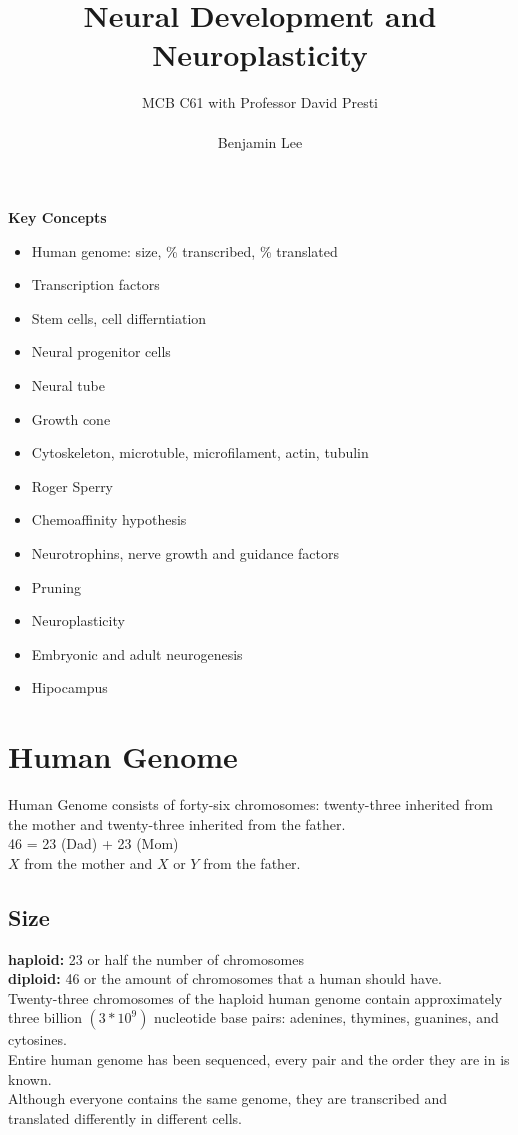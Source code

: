 \documentclass{article}
\title{Neural Development and Neuroplasticity}
\author{MCB C61 with Professor David Presti \\ \\ Benjamin Lee}
\begin{document}
\maketitle

\textbf{Key Concepts}
\begin{itemize}
    \item Human genome: size, \% transcribed, \% translated
    \item Transcription factors
    \item Stem cells, cell differntiation
    \item Neural progenitor cells
    \item Neural tube
    \item Growth cone
    \item Cytoskeleton, microtuble, microfilament, actin, tubulin
    \item Roger Sperry
    \item Chemoaffinity hypothesis
    \item Neurotrophins, nerve growth and guidance factors
    \item Pruning 
    \item Neuroplasticity
    \item Embryonic and adult neurogenesis
    \item Hipocampus
\end{itemize}
\newpage

\section{Human Genome}
Human Genome consists of forty-six chromosomes: twenty-three inherited from the mother and twenty-three inherited from the father. \\
46 = 23 (Dad) + 23 (Mom) \\ 
$X$ from the mother and $X$ or $Y$ from the father. \\
\subsection{Size}
\textbf{haploid:} 23 or half the number of chromosomes \\
\textbf{diploid:} 46 or the amount of chromosomes that a human should have. \\
Twenty-three chromosomes of the haploid human genome contain approximately three billion $(3  *  10^9)$ nucleotide base pairs: adenines, thymines, guanines, and cytosines. \\
Entire human genome has been sequenced, every pair and the order they are in is known. \\
Although everyone contains the same genome, they are transcribed and translated differently in different cells. \\
\end{document}
